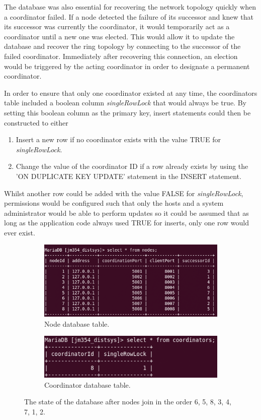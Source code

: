\documentclass[12pt]{article}
\begin{document}
The database was also essential for recovering the network topology quickly when a coordinator failed. If a node detected the failure of its successor and knew that its successor was currently the coordinator, it would temporarily act as a coordinator until a new one was elected. This would allow it to update the database and recover the ring topology by connecting to the successor of the failed coordinator. Immediately after recovering this connection, an election would be triggered by the acting coordinator in order to designate a permanent coordinator.

In order to ensure that only one coordinator existed at any time, the coordinators table included a boolean column \emph{singleRowLock} that would always be true. By setting this boolean column as the primary key, insert statements could then be constructed to either 
\begin{enumerate}
	\item Insert a new row if no coordinator exists with the value TRUE for \emph{singleRowLock}.
	\item Change the value of the coordinator ID if a row already exists by using the 'ON DUPLICATE KEY UPDATE' statement in the INSERT statement.
\end{enumerate}

Whilst another row could be added with the value FALSE for \emph{singleRowLock}, permissions would be configured such that only the hosts and a system administrator would be able to perform updates so it could be assumed that as long as the application code always used TRUE for inserts, only one row would ever exist. 

\begin{figure}[!h]
\centering
\begin{subfigure}{.5\textwidth}
  \centering
  \includegraphics[width=0.95\linewidth]{images/fullring}
  \caption{Node database table.}
  \label{fig:nodetable}
\end{subfigure}%
\begin{subfigure}{.5\textwidth}
  \centering
  \includegraphics[width=0.95\linewidth]{images/coord}
  \caption{Coordinator database table.}
  \label{fig:coordtable}
\end{subfigure}
\caption{The state of the database after nodes join in the order 6, 5, 8, 3, 4, 7, 1, 2.}
\label{fig:dbstate}
\end{figure}
\end{document}
